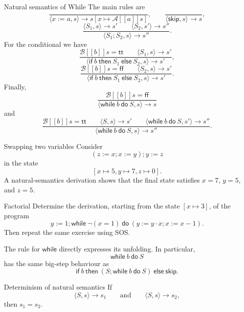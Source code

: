 \documentclass[a4paper]{article}
\newcommand{\ttt}{\mathsf{tt}}
\newcommand{\fff}{\mathsf{ff}}
\newcommand{\skipc}{\mathsf{skip}}
\newcommand{\sem}[1]{[\![#1]\!]}
\begin{document}
\begin{snippetdefinition}{Natural semantics of While}
    The main rules are
    \[
        \frac{}{\langle x:=a,s\rangle\to s[x\mapsto\mathcal A\sem{a}s]},
        \qquad
        \frac{}{\langle\skipc,s\rangle\to s},
    \]
    \[
        \frac{
            \langle S_1,s\rangle\to s'
            \qquad
            \langle S_2,s'\rangle\to s''
        }{
            \langle S_1;S_2,s\rangle\to s''
        }.
    \]
    For the conditional we have
    \[
        \frac{\mathcal B\sem{b}s=\ttt\qquad\langle S_1,s\rangle\to s'}
        {\langle\mathsf{if}\ b\ \mathsf{then}\ S_1\ \mathsf{else}\ S_2,s\rangle\to s'},
    \]
    \[
        \frac{\mathcal B\sem{b}s=\fff\qquad\langle S_2,s\rangle\to s'}
        {\langle\mathsf{if}\ b\ \mathsf{then}\ S_1\ \mathsf{else}\ S_2,s\rangle\to s'}.
    \]
    Finally,
    \[
        \frac{\mathcal B\sem{b}s=\fff}
        {\langle\mathsf{while}\ b\ \mathsf{do}\ S,s\rangle\to s}
    \]
    and
    \[
        \frac{
            \mathcal B\sem{b}s=\ttt
            \qquad
            \langle S,s\rangle\to s'
            \qquad
            \langle\mathsf{while}\ b\ \mathsf{do}\ S,s'\rangle\to s''
        }{
            \langle\mathsf{while}\ b\ \mathsf{do}\ S,s\rangle\to s''
        }.
    \]
\end{snippetdefinition}

\begin{snippetexample}{Swapping two variables}
    Consider
    \[
        (z:=x;x:=y);y:=z
    \]
    in the state
    \[
        [x\mapsto5,y\mapsto7,z\mapsto0].
    \]
    A natural-semantics derivation shows that the final state satisfies
    \(x=7\), \(y=5\), and \(z=5\).
\end{snippetexample}

\begin{snippetexercise}{Factorial}
    Determine the derivation, starting from the state \([x\mapsto3]\), of the program
    \[
        y:=1;
        \mathsf{while}\ \neg(x=1)\ \mathsf{do}\
        (y:=y\cdot x;x:=x-1).
    \]
    Then repeat the same exercise using SOS.
\end{snippetexercise}

The rule for \(\mathsf{while}\) directly expresses its unfolding.
In particular,
\[
    \mathsf{while}\ b\ \mathsf{do}\ S
\]
has the same big-step behaviour as
\[
    \mathsf{if}\ b\ \mathsf{then}\ (S;\mathsf{while}\ b\ \mathsf{do}\ S)\ \mathsf{else}\ \skipc.
\]

\begin{snippettheorem}{Determinism of natural semantics}
    If
    \[
        \langle S,s\rangle\to s_1
        \qquad\text{and}\qquad
        \langle S,s\rangle\to s_2,
    \]
    then \(s_1=s_2\).
\end{snippettheorem}
\end{document}
